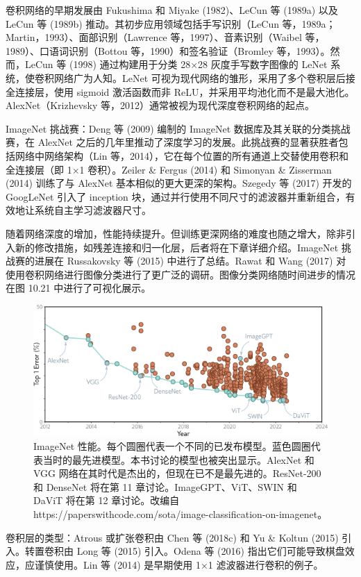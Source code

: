 卷积网络的早期发展由 Fukushima 和 Miyake (1982)、LeCun 等 (1989a) 以及 LeCun 等 (1989b) 推动。其初步应用领域包括手写识别（LeCun 等，1989a；Martin，1993）、面部识别（Lawrence 等，1997）、音素识别（Waibel 等，1989）、口语词识别（Bottou 等，1990）和签名验证（Bromley 等，1993）。然而，LeCun 等 (1998) 通过构建用于分类 28×28 灰度手写数字图像的 LeNet 系统，使卷积网络广为人知。LeNet 可视为现代网络的雏形，采用了多个卷积层后接全连接层，使用 sigmoid 激活函数而非 ReLU，并采用平均池化而不是最大池化。AlexNet（Krizhevsky 等，2012）通常被视为现代深度卷积网络的起点。

ImageNet 挑战赛：Deng 等 (2009) 编制的 ImageNet 数据库及其关联的分类挑战赛，在 AlexNet 之后的几年里推动了深度学习的发展。此挑战赛的显著获胜者包括网络中网络架构（Lin 等，2014），它在每个位置的所有通道上交替使用卷积和全连接层（即 1×1 卷积）。Zeiler \& Fergus (2014) 和 Simonyan \& Zisserman (2014) 训练了与 AlexNet 基本相似的更大更深的架构。Szegedy 等 (2017) 开发的 GoogLeNet 引入了 inception 块，通过并行使用不同尺寸的滤波器并重新组合，有效地让系统自主学习滤波器尺寸。

随着网络深度的增加，性能持续提升。但训练更深网络的难度也随之增大，除非引入新的修改措施，如残差连接和归一化层，后者将在下章详细介绍。ImageNet 挑战赛的进展在 Russakovsky 等 (2015) 中进行了总结。Rawat 和 Wang (2017) 对使用卷积网络进行图像分类进行了更广泛的调研。图像分类网络随时间进步的情况在图 10.21 中进行了可视化展示。


\begin{figure}[ht!]
	\centering
	\includegraphics[width=0.7\linewidth]{png/chapter10/ConvImageNetPerformance.png}
	\caption{ImageNet 性能。每个圆圈代表一个不同的已发布模型。蓝色圆圈代表当时的最先进模型。本书讨论的模型也被突出显示。AlexNet 和 VGG 网络在其时代是杰出的，但现在已不是最先进的。ResNet-200 和 DenseNet 将在第 11 章讨论。ImageGPT、ViT、SWIN 和 DaViT 将在第 12 章讨论。改编自 https://paperswithcode.com/sota/image-classification-on-imagenet。}
\end{figure}

卷积层的类型：Atrous 或扩张卷积由 Chen 等 (2018c) 和 Yu \& Koltun (2015) 引入。转置卷积由 Long 等 (2015) 引入。Odena 等 (2016) 指出它们可能导致棋盘效应，应谨慎使用。Lin 等 (2014) 是早期使用 1×1 滤波器进行卷积的例子。

